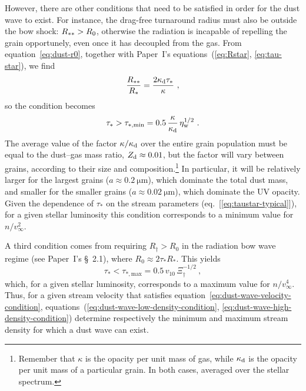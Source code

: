 However, there are other conditions that need to be satisfied in order
for the dust wave to exist.  For instance, the drag-free turnaround
radius must also be outside the bow shock: \(R_{**} > R_0\),
otherwise the radiation is incapable of repelling the grain
opportunely, even once it has decoupled from the gas.  From
equation~\eqref{eq:dust-r0}, together with Paper~I's
equations~(\ref{eq:Rstar}, \ref{eq:tau-star}),
we find
\begin{equation}
  \label{eq:Rstarstar-over-Rstar}
  \frac{R_{**}}{R_*} = \frac{2 \kappa_{\text{d}} \tau_*}{\kappa} \ , 
\end{equation}
so the condition becomes
\begin{equation}
  \label{eq:dust-wave-low-density-condition}
  \tau_* >  \tau_{*,\text{min}} = 0.5\, \frac{\kappa}{\kappa_{\text{d}}}\, \eta_{\text{w}}^{1/2} 
  \ . 
\end{equation}
The average value of the factor \(\kappa / \kappa_{\text{d}}\) over the entire grain
population must be equal to the dust--gas mass ratio,
\(Z_{\text{d}} \approx 0.01\), but the factor will vary between grains, according
to their size and composition.\footnote{%
  Remember that \(\kappa\) is the opacity per unit mass of gas, while
  \(\kappa_{\text{d}}\) is the opacity per unit mass of a particular grain. In
  both cases, averaged over the stellar spectrum.} %
In particular, it will be relatively larger for the largest grains
(\(a \approx \SI{0.2}{\um}\)), which dominate the total dust mass, and
smaller for the smaller grains (\(a \approx \SI{0.02}{\um}\)), which
dominate the UV opacity.  Given the dependence of \(\tau_*\) on the
stream parameters (eq.~[\ref{eq:taustar-typical}]),
for a given
stellar luminosity this condition corresponds to a minimum value for
\(n / v_\infty^2\).

A third condition comes from requiring \(R_\dag > R_0\) in the radiation
bow wave regime (see Paper~I's \S~2.1),
where
\(R_0 \approx 2 \tau_* R_*\).  This yields
\begin{equation}
  \label{eq:dust-wave-high-density-condition}
  \tau_* < \tau_{*,\text{max}} = 0.5\, v_{10}\, \Xi_\dag^{-1/2} \ , 
\end{equation}
which, for a given stellar luminosity, corresponds to a maximum value
for \(n / v_\infty^4\).  Thus, for a given stream velocity that satisfies
equation~\eqref{eq:dust-wave-velocity-condition},
equations~(\ref{eq:dust-wave-low-density-condition},
\ref{eq:dust-wave-high-density-condition}) determine respectively the
minimum and maximum stream density for which a dust wave can exist.

